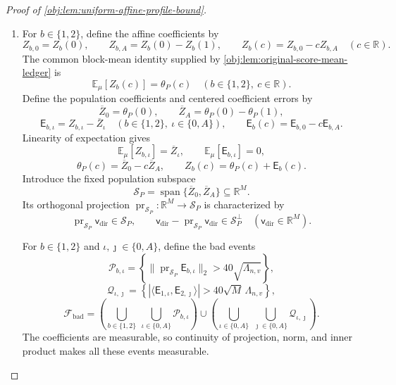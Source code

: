 \begin{proof}[Proof of \cref{obj:lem:uniform-affine-profile-bound}]
\begin{enumerate}
\item
For \(b\in\{1,2\}\), define the affine coefficients by
\[
Z_{b,0}=Z_b(0),
\qquad
Z_{b,A}=Z_b(0)-Z_b(1),
\qquad
Z_b(c)=Z_{b,0}-cZ_{b,A}
\quad(c\in\mathbb R).
\]
The common block-mean identity supplied by \cref{obj:lem:original-score-mean-ledger} is
\[
\mathbb E_\mu[Z_b(c)]=\theta_P(c)
\quad(b\in\{1,2\},\ c\in\mathbb R).
\]
Define the population coefficients and centered coefficient errors by
\[
\overline Z_0=\theta_P(0),
\qquad
\overline Z_A=\theta_P(0)-\theta_P(1),
\]
\[
\mathsf E_{b,\iota}=Z_{b,\iota}-\overline Z_\iota
\quad(b\in\{1,2\},\ \iota\in\{0,A\}),
\qquad
\mathsf E_b(c)=\mathsf E_{b,0}-c\mathsf E_{b,A}.
\]
Linearity of expectation gives
\[
\mathbb E_\mu[Z_{b,\iota}]=\overline Z_\iota,
\qquad
\mathbb E_\mu[\mathsf E_{b,\iota}]=0,
\]
\[
\theta_P(c)=\overline Z_0-c\overline Z_A,
\qquad
Z_b(c)=\theta_P(c)+\mathsf E_b(c).
\]
Introduce the fixed population subspace
\[
\mathcal S_P=\operatorname{span}\{\overline Z_0,\overline Z_A\}
\subseteq\mathbb R^M.
\]
Its orthogonal projection \(\operatorname{pr}_{\mathcal S_P}:\mathbb R^M\to\mathcal S_P\) is characterized by
\[
\operatorname{pr}_{\mathcal S_P}\mathsf v_{\mathrm{dir}}\in\mathcal S_P,
\qquad
\mathsf v_{\mathrm{dir}}-\operatorname{pr}_{\mathcal S_P}\mathsf v_{\mathrm{dir}}\in\mathcal S_P^\perp
\quad(\mathsf v_{\mathrm{dir}}\in\mathbb R^M).
\]

For \(b\in\{1,2\}\) and \(\iota,\jmath\in\{0,A\}\), define the bad events
\[
\mathcal P_{b,\iota}
=
\left\{
\|\operatorname{pr}_{\mathcal S_P}\mathsf E_{b,\iota}\|_2
>
40\sqrt{\Lambda_{n,v}}
\right\},
\]
\[
\mathcal Q_{\iota,\jmath}
=
\left\{
|\langle\mathsf E_{1,\iota},\mathsf E_{2,\jmath}\rangle|
>
40\sqrt M\,\Lambda_{n,v}
\right\},
\]
\[
\mathcal F_{\mathrm{bad}}
=
\left(
\bigcup_{b\in\{1,2\}}\ \bigcup_{\iota\in\{0,A\}}
\mathcal P_{b,\iota}
\right)
\cup
\left(
\bigcup_{\iota\in\{0,A\}}\ \bigcup_{\jmath\in\{0,A\}}
\mathcal Q_{\iota,\jmath}
\right).
\]
The coefficients are measurable, so continuity of projection, norm, and inner product makes all these events measurable.


\end{enumerate}
\end{proof}
